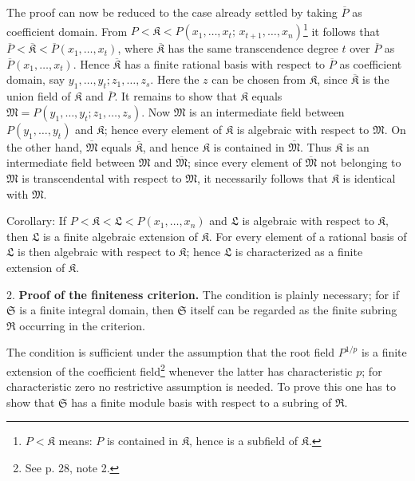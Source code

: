 \documentclass[11pt]{article}
\begin{document}
The proof can now be reduced to the case already settled by taking $\overline P$ as coefficient domain. From $P<\mathfrak K<P(x_1,\ldots,x_t;\,x_{t+1},\ldots,x_n)$\footnote{$P<\mathfrak K$ means: $P$ is contained in $\mathfrak K$, hence is a subfield of $\mathfrak K$.} it follows that $\overline P<\overline{\mathfrak K}<\overline P(x_1,\ldots,x_t)$, where $\overline{\mathfrak K}$ has the same transcendence degree $t$ over $\overline P$ as $\overline P(x_1,\ldots,x_t)$. Hence $\overline{\mathfrak K}$ has a finite rational basis with respect to $\overline P$ as coefficient domain, say $y_1,\ldots,y_t; z_1,\ldots,z_s$. Here the $z$ can be chosen from $\mathfrak K$, since $\overline{\mathfrak K}$ is the union field of $\mathfrak K$ and $\overline P$. It remains to show that $\mathfrak K$ equals $\mathfrak M=P(y_1,\ldots,y_t;z_1,\ldots,z_s)$. Now $\mathfrak M$ is an intermediate field between $P(y_1,\ldots,y_t)$ and $\mathfrak K$; hence every element of $\mathfrak K$ is algebraic with respect to $\mathfrak M$. On the other hand, $\overline{\mathfrak M}$ equals $\overline{\mathfrak K}$, and hence $\mathfrak K$ is contained in $\overline{\mathfrak M}$. Thus $\mathfrak K$ is an intermediate field between $\mathfrak M$ and $\overline{\mathfrak M}$; since every element of $\overline{\mathfrak M}$ not belonging to $\mathfrak M$ is transcendental with respect to $\mathfrak M$, it necessarily follows that $\mathfrak K$ is identical with $\mathfrak M$.

Corollary: If $P<\mathfrak K<\mathfrak L<P(x_1,\ldots,x_n)$ and $\mathfrak L$ is algebraic with respect to $\mathfrak K$, then $\mathfrak L$ is a finite algebraic extension of $\mathfrak K$. For every element of a rational basis of $\mathfrak L$ is then algebraic with respect to $\mathfrak K$; hence $\mathfrak L$ is characterized as a finite extension of $\mathfrak K$.

2. \textbf{Proof of the finiteness criterion.} The condition is plainly necessary; for if $\mathfrak S$ is a finite integral domain, then $\mathfrak S$ itself can be regarded as the finite subring $\mathfrak R$ occurring in the criterion.

The condition is sufficient under the assumption that the root field $P^{1/p}$ is a finite extension of the coefficient field\footnote{See p. 28, note 2.} whenever the latter has characteristic $p$; for characteristic zero no restrictive assumption is needed. To prove this one has to show that $\mathfrak S$ has a finite module basis with respect to a subring of $\mathfrak R$.
\end{document}
